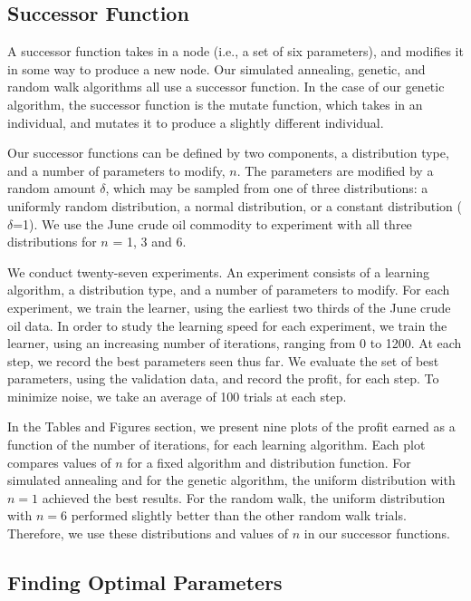 \documentclass[12pt]{article}
\begin{document}
\subsection{Successor Function}

A successor function takes in a node (i.e., a set of six parameters), and
modifies it in some way to produce a new node.  Our simulated annealing,
genetic, and random walk algorithms all use a successor function.  In the case
of our genetic algorithm, the successor function is the mutate function, which
takes in an individual, and mutates it to produce a slightly different
individual.

Our successor functions can be defined by two components, a distribution type,
and a number of parameters to modify, $n$. The parameters are modified by a
random amount $\delta$, which may be sampled from one of three distributions: a
uniformly random distribution, a normal distribution, or a constant distribution
($\delta$=1). We use the June crude oil commodity to experiment with all three
distributions for $n$ = 1, 3 and 6.

We conduct twenty-seven experiments. An experiment consists of a learning
algorithm, a distribution type, and a number of parameters to modify. For each
experiment, we train the learner, using the earliest two thirds of the June
crude oil data. In order to study the learning speed for each experiment, we
train the learner, using an increasing number of iterations, ranging from 0 to
1200.  At each step, we record the best parameters seen thus far.  We evaluate
the set of best parameters, using the validation data, and record the profit, for
each step. To minimize noise, we take an average of 100 trials at each step.

In the Tables and Figures section, we present nine plots of the profit earned as
a function of the number of iterations, for each learning algorithm.  Each plot
compares values of $n$ for a fixed algorithm and distribution function.  For
simulated annealing and for the genetic algorithm, the uniform distribution with
$n = 1$ achieved the best results.  For the random walk, the uniform
distribution with $n = 6$ performed slightly better than the other random walk
trials.  Therefore, we use these distributions and values of $n$ in our
successor functions.

\subsection{Finding Optimal Parameters}
\end{document}
